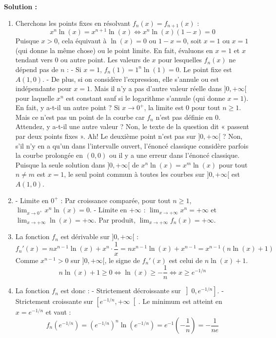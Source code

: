 \textbf{Solution :}
\begin{enumerate}
    \item Cherchons les points fixes en résolvant $f_n(x) = f_{n+1}(x)$ :
    \[
    x^n \ln(x) = x^{n+1} \ln(x) \iff x^n \ln(x) (1-x) = 0
    \]
    Puisque $x > 0$, cela équivaut à $\ln(x) = 0$ ou $1-x = 0$, soit $x = 1$ ou $x = 1$ (qui donne la même chose) ou le point limite.
    En fait, évaluons en $x=1$ et $x$ tendant vers 0 ou autre point. Les valeurs de $x$ pour lesquelles $f_n(x)$ ne dépend pas de $n$ :
    - Si $x = 1$, $f_n(1) = 1^n \ln(1) = 0$. Le point fixe est $A(1, 0)$.
    - De plus, si on considère l'expression, elle s'annule ou est indépendante pour $x=1$. Mais il n'y a pas d'autre valeur réelle dans $]0, +\infty[$ pour laquelle $x^n$ est constant sauf si le logarithme s'annule (qui donne $x=1$).
    En fait, y a-t-il un autre point ? Si $x \to 0^+$, la limite est 0 pour tout $n \ge 1$. Mais ce n'est pas un point de la courbe car $f_n$ n'est pas définie en 0.
    Attendez, y a-t-il une autre valeur ? Non, le texte de la question dit « passent par deux points fixes ». Ah! Le deuxième point n'est pas sur $]0, +\infty[$ ? Non, s'il n'y en a qu'un dans l'intervalle ouvert, l'énoncé classique considère parfois la courbe prolongée en $(0,0)$ ou il y a une erreur dans l'énoncé classique.
    Puisque la seule solution dans $]0, +\infty[$ de $x^n \ln(x) = x^m \ln(x)$ pour tout $n \ne m$ est $x = 1$, le seul point commun à toutes les courbes sur $]0, +\infty[$ est $A(1, 0)$.
    
    \item - Limite en $0^+$ : Par croissance comparée, pour tout $n \ge 1$, $\lim_{x \to 0^+} x^n \ln(x) = 0$.
      - Limite en $+\infty$ : $\lim_{x \to +\infty} x^n = +\infty$ et $\lim_{x \to +\infty} \ln(x) = +\infty$. Par produit, $\lim_{x \to +\infty} f_n(x) = +\infty$.
      
    \item La fonction $f_n$ est dérivable sur $]0, +\infty[$ :
      \[
      f_n'(x) = n x^{n-1} \ln(x) + x^n \cdot \frac{1}{x} = n x^{n-1} \ln(x) + x^{n-1} = x^{n-1} (n \ln(x) + 1)
      \]
      Comme $x^{n-1} > 0$ sur $]0, +\infty[$, le signe de $f_n'(x)$ est celui de $n\ln(x)+1$.
      \[
      n\ln(x) + 1 \ge 0 \iff \ln(x) \ge -\frac{1}{n} \iff x \ge e^{-1/n}
      \]
      
    \item La fonction $f_n$ est donc :
      - Strictement décroissante sur $\left]0, e^{-1/n}\right]$.
      - Strictement croissante sur $\left[e^{-1/n}, +\infty\right[$.
      Le minimum est atteint en $x = e^{-1/n}$ et vaut :
      \[
      f_n\left(e^{-1/n}\right) = \left(e^{-1/n}\right)^n \ln\left(e^{-1/n}\right) = e^{-1} \left(-\frac{1}{n}\right) = -\frac{1}{ne}
      \]
\end{enumerate}

